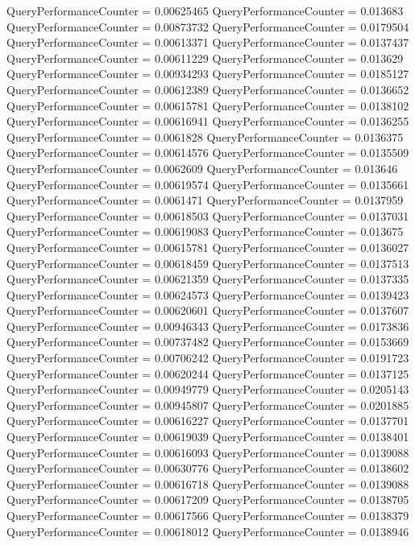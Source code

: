 \documentclass[9pt]{article}
\theoremstyle{plain}
\theoremstyle{definition}
\theoremstyle{remark}
\numberwithin{equation}{section}
\begin{document}
QueryPerformanceCounter  =  0.00625465
QueryPerformanceCounter  =  0.013683
QueryPerformanceCounter  =  0.00873732
QueryPerformanceCounter  =  0.0179504
QueryPerformanceCounter  =  0.00613371
QueryPerformanceCounter  =  0.0137437
QueryPerformanceCounter  =  0.00611229
QueryPerformanceCounter  =  0.013629
QueryPerformanceCounter  =  0.00934293
QueryPerformanceCounter  =  0.0185127
QueryPerformanceCounter  =  0.00612389
QueryPerformanceCounter  =  0.0136652
QueryPerformanceCounter  =  0.00615781
QueryPerformanceCounter  =  0.0138102
QueryPerformanceCounter  =  0.00616941
QueryPerformanceCounter  =  0.0136255
QueryPerformanceCounter  =  0.0061828
QueryPerformanceCounter  =  0.0136375
QueryPerformanceCounter  =  0.00614576
QueryPerformanceCounter  =  0.0135509
QueryPerformanceCounter  =  0.0062609
QueryPerformanceCounter  =  0.013646
QueryPerformanceCounter  =  0.00619574
QueryPerformanceCounter  =  0.0135661
QueryPerformanceCounter  =  0.0061471
QueryPerformanceCounter  =  0.0137959
QueryPerformanceCounter  =  0.00618503
QueryPerformanceCounter  =  0.0137031
QueryPerformanceCounter  =  0.00619083
QueryPerformanceCounter  =  0.013675
QueryPerformanceCounter  =  0.00615781
QueryPerformanceCounter  =  0.0136027
QueryPerformanceCounter  =  0.00618459
QueryPerformanceCounter  =  0.0137513
QueryPerformanceCounter  =  0.00621359
QueryPerformanceCounter  =  0.0137335
QueryPerformanceCounter  =  0.00624573
QueryPerformanceCounter  =  0.0139423
QueryPerformanceCounter  =  0.00620601
QueryPerformanceCounter  =  0.0137607
QueryPerformanceCounter  =  0.00946343
QueryPerformanceCounter  =  0.0173836
QueryPerformanceCounter  =  0.00737482
QueryPerformanceCounter  =  0.0153669
QueryPerformanceCounter  =  0.00706242
QueryPerformanceCounter  =  0.0191723
QueryPerformanceCounter  =  0.00620244
QueryPerformanceCounter  =  0.0137125
QueryPerformanceCounter  =  0.00949779
QueryPerformanceCounter  =  0.0205143
QueryPerformanceCounter  =  0.00945807
QueryPerformanceCounter  =  0.0201885
QueryPerformanceCounter  =  0.00616227
QueryPerformanceCounter  =  0.0137701
QueryPerformanceCounter  =  0.00619039
QueryPerformanceCounter  =  0.0138401
QueryPerformanceCounter  =  0.00616093
QueryPerformanceCounter  =  0.0139088
QueryPerformanceCounter  =  0.00630776
QueryPerformanceCounter  =  0.0138602
QueryPerformanceCounter  =  0.00616718
QueryPerformanceCounter  =  0.0139088
QueryPerformanceCounter  =  0.00617209
QueryPerformanceCounter  =  0.0138705
QueryPerformanceCounter  =  0.00617566
QueryPerformanceCounter  =  0.0138379
QueryPerformanceCounter  =  0.00618012
QueryPerformanceCounter  =  0.0138946
\end{document}
